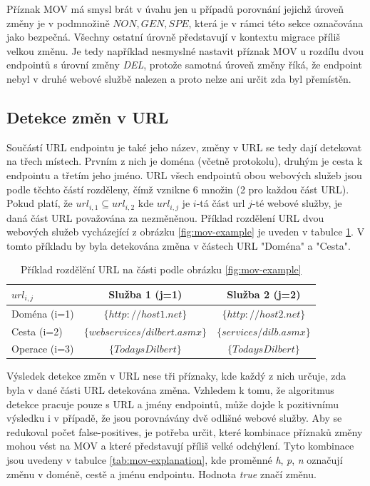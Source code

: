 \documentclass[czech,DP]{thesiskiv}
\begin{document}
Příznak MOV má smysl brát v úvahu jen u případů porovnání jejichž úroveň změny je v podmnožině ${NON, GEN, SPE}$, která je v rámci této sekce označována jako bezpečná. Všechny ostatní úrovně představují v kontextu migrace příliš velkou změnu. Je tedy  například nesmyslné nastavit příznak MOV u rozdílu dvou endpointů s úrovní změny \textit{DEL}, protože samotná úroveň změny říká, že endpoint nebyl v druhé webové službě nalezen a proto nelze ani určit zda byl přemístěn.  

\subsection{Detekce změn v URL}

Součástí URL endpointu je také jeho název, změny v URL se tedy dají detekovat na třech místech. Prvním z nich je doména (včetně protokolu), druhým je cesta k endpointu a třetím jeho jméno. URL všech endpointů obou webových služeb jsou podle těchto částí rozděleny, čímž vznikne 6 množin (2 pro každou část URL). Pokud platí, že $url_{i,1} \subseteq url_{i,2}$ kde $url_{i,j}$ je $i$-tá část url $j$-té webové služby, je daná část URL považována za nezměněnou. Příklad rozdělení URL dvou webových služeb vycházející z obrázku \ref{fig:mov-example} je uveden v tabulce \ref{tab:url-diff-example}. V tomto příkladu by byla detekována změna v částech URL "Doména" a "Cesta".

\begin{table}[h]
	\begin{tabular}{|l|c|c|}
		\hline
		$url_{i,j}$ & Služba 1 (j=1) & Služba 2 (j=2) \\
		\hline
		\hline
		Doména (i=1) & $\{http://host1.net\}$ & $\{http://host2.net\}$ \\
		\hline
		Cesta (i=2) & $\{webservices/dilbert.asmx\}$ &  $\{services/dilb.asmx\}$ \\
		\hline
		Operace (i=3) & $\{TodaysDilbert\}$ & $\{TodaysDilbert\}$ \\
		\hline
	\end{tabular}
	\caption{Příklad rozdělění URL na části podle obrázku \ref{fig:mov-example}}
	\label{tab:url-diff-example}
\end{table}
  
Výsledek detekce změn v URL nese tři příznaky, kde každý z nich určuje, zda byla v dané části URL detekována změna. Vzhledem k tomu, že algoritmus detekce pracuje pouze s URL a jmény endpointů, může dojde k pozitivnímu výsledku i v případě, že jsou porovnávány dvě odlišné webové služby. Aby se redukoval počet false-positives, je potřeba určit, které kombinace příznaků změny mohou vést na MOV a které představují příliš velké odchýlení. Tyto kombinace jsou uvedeny v tabulce \ref{tab:mov-explanation}, kde proměnné \textit{h}, \textit{p}, \textit{n} označují změnu v doméně, cestě a jménu endpointu. Hodnota \textit{true} značí změnu.
\end{document}
